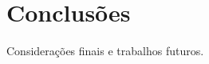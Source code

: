 \documentclass[oneside,openright,12pt]{ufsm_2015} %
\begin{document}

\chapter{Conclusões}
\label{sec:conclusao}

    \par Considerações finais e trabalhos futuros.




	
\apendice %

        
\anexo    %

\end{document}
